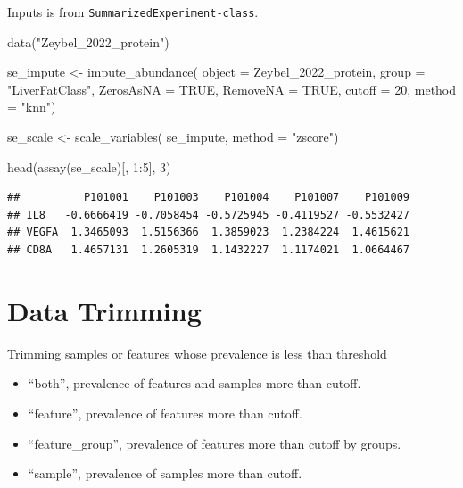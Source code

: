 \documentclass[
]{book}
\newenvironment{Shaded}{\begin{snugshade}}{\end{snugshade}}
\newcommand{\AttributeTok}[1]{\textcolor[rgb]{0.77,0.63,0.00}{#1}}
\newcommand{\ConstantTok}[1]{\textcolor[rgb]{0.00,0.00,0.00}{#1}}
\newcommand{\DecValTok}[1]{\textcolor[rgb]{0.00,0.00,0.81}{#1}}
\newcommand{\FunctionTok}[1]{\textcolor[rgb]{0.00,0.00,0.00}{#1}}
\newcommand{\NormalTok}[1]{#1}
\newcommand{\OtherTok}[1]{\textcolor[rgb]{0.56,0.35,0.01}{#1}}
\newcommand{\SpecialCharTok}[1]{\textcolor[rgb]{0.00,0.00,0.00}{#1}}
\newcommand{\StringTok}[1]{\textcolor[rgb]{0.31,0.60,0.02}{#1}}
\begin{document}
Inputs is from \texttt{SummarizedExperiment-class}.

\begin{Shaded}
\begin{Highlighting}[]
\FunctionTok{data}\NormalTok{(}\StringTok{"Zeybel\_2022\_protein"}\NormalTok{)}

\NormalTok{se\_impute }\OtherTok{\textless{}{-}} \FunctionTok{impute\_abundance}\NormalTok{(}
  \AttributeTok{object =}\NormalTok{ Zeybel\_2022\_protein,}
  \AttributeTok{group =} \StringTok{"LiverFatClass"}\NormalTok{,}
  \AttributeTok{ZerosAsNA =} \ConstantTok{TRUE}\NormalTok{,}
  \AttributeTok{RemoveNA =} \ConstantTok{TRUE}\NormalTok{,}
  \AttributeTok{cutoff =} \DecValTok{20}\NormalTok{,}
  \AttributeTok{method =} \StringTok{"knn"}\NormalTok{)}

\NormalTok{se\_scale }\OtherTok{\textless{}{-}} \FunctionTok{scale\_variables}\NormalTok{(}
\NormalTok{  se\_impute,}
  \AttributeTok{method =} \StringTok{"zscore"}\NormalTok{)}

\FunctionTok{head}\NormalTok{(}\FunctionTok{assay}\NormalTok{(se\_scale)[, }\DecValTok{1}\SpecialCharTok{:}\DecValTok{5}\NormalTok{], }\DecValTok{3}\NormalTok{)}
\end{Highlighting}
\end{Shaded}

\begin{verbatim}
##          P101001    P101003    P101004    P101007    P101009
## IL8   -0.6666419 -0.7058454 -0.5725945 -0.4119527 -0.5532427
## VEGFA  1.3465093  1.5156366  1.3859023  1.2384224  1.4615621
## CD8A   1.4657131  1.2605319  1.1432227  1.1174021  1.0664467
\end{verbatim}

\hypertarget{data-trimming}{%
\section{Data Trimming}\label{data-trimming}}

Trimming samples or features whose prevalence is less than threshold

\begin{itemize}
\item
  ``both'', prevalence of features and samples more than cutoff.
\item
  ``feature'', prevalence of features more than cutoff.
\item
  ``feature\_group'', prevalence of features more than cutoff by groups.
\item
  ``sample'', prevalence of samples more than cutoff.
\end{itemize}
\end{document}
